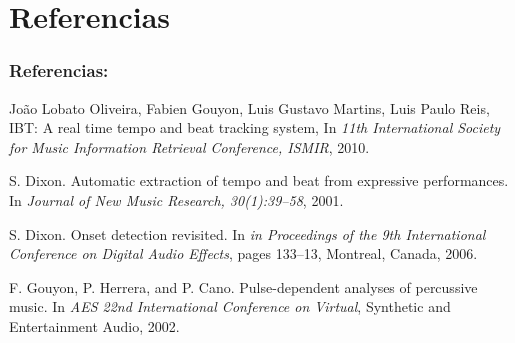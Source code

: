 \documentclass[slidestop,compress,mathserif,xcolor=svgnames,table]{beamer}
\begin{document}
\section{Referencias}
\begin{frame}
\frametitle{Referencias:}
\begin{thebibliography}{99}
\begin{small}

Jo\~ao Lobato Oliveira, Fabien Gouyon, Luis Gustavo Martins, Luis Paulo Reis, IBT: A real time tempo and beat tracking system, In \emph{11th International Society for Music Information Retrieval Conference, ISMIR}, 2010.

S. Dixon. Automatic extraction of tempo and beat from
expressive performances. In \emph{Journal of New Music Research, 30(1):39–58}, 2001.

S. Dixon. Onset detection revisited. In \emph{in Proceedings of the 9th International Conference on Digital Audio Effects}, pages 133–13, Montreal, Canada, 2006.

F. Gouyon, P. Herrera, and P. Cano. Pulse-dependent analyses of percussive music. In \emph{AES 22nd International Conference on Virtual}, Synthetic and Entertainment Audio, 2002.

\end{small}
\end{thebibliography}
\end{frame}
\end{document}
